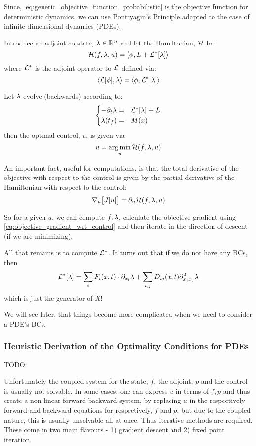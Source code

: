 Since, \cref{eq:generic_objective_function_probabilistic} is the objective
function for deterministic dynamics, we can use Pontryagin's Principle adapted
to the case of infinite dimensional dynamics (PDEs). 

Introduce an adjoint co-state, ${\lambda} \in { \mathbb{R} }^n$ and let the Hamiltonian, ${ \mathcal{H} }$ be:
$$
{ \mathcal{H} }({f}, {\lambda}, u)= \langle \phi, L + { { \mathcal{L} }^* }[{\lambda}] \rangle$$
where ${ { \mathcal{L} }^* }$ is the adjoint operator to ${ \mathcal{L} }$ defined via:
$$
\langle { \mathcal{L} } [\phi], {\lambda} \rangle =\langle \phi, { { \mathcal{L} }^* }[{\lambda}] \rangle
$$

Let ${\lambda}$ evolve (backwards) according to:
\begin{equation*}
\begin{cases}
-{\partial}_t {\lambda} =& { { \mathcal{L} }^* }[{\lambda}] + L
\\
{\lambda}({ t_f }) =& M(x)  
\end{cases}
\end{equation*}
then the optimal control, $u$, is given via
$$
u = \argmin_u {\H(\f, \l, u)}
$$    

An important fact, useful for computations, is that the total derivative of the
objective with respect to the control is given by the partial derivative of the
Hamiltonian with respect to the control:
\begin{equation}
{ \nabla }_u \big[J[u] \big] = {\partial}_u { \mathcal{H} }({f}, {\lambda}, u)
\label{eq:objective_gradient_wrt_control}
\end{equation}

So for a given $u$, we can compute ${f},{\lambda}$, calculate the objective gradient
using \cref{eq:objective_gradient_wrt_control} and then iterate in the direction
of descent (if we are minimizing).

All that remains is to compute ${ { \mathcal{L} }^* }$. It turns out that if we do not have any
BCs, then
$$
{ { \mathcal{L} }^* }[{\lambda}] = \sum_i F_i(x,t) \cdot {\partial}_{x_i} {\lambda} + \sum_{i,j} D_{ij}(x,t)
{\partial}^2_{x_i x_j}{\lambda} 
$$ 
which is just the generator of $X$! 

We will see later, that things become more complicated when we need to
consider a PDE's BCs.

 
\subsubsection{Heuristic Derivation of the Optimality Conditions for PDEs}
\label{sec:Pontryagin_heuristic_derivation}
TODO: \cite{Borzi2012,Lenhart2007}

  
  
  
\vskip 35pt


Unfortunately the coupled system for the state, $f$, the adjoint, $p$ and the
control is usually not solvable. In some cases, one can express $u$ in terms of
$f,p$ and thus create a non-linear forward-backward system, by replacing $u$ in
the respectively forward and backward equations for respectively, $f$ and $p$,
but due to the coupled nature, this is usually unsolvable all at once. Thus
iterative methods are required. These come in two main flavours - 1) gradient
descent and 2) fixed point iteration. 


